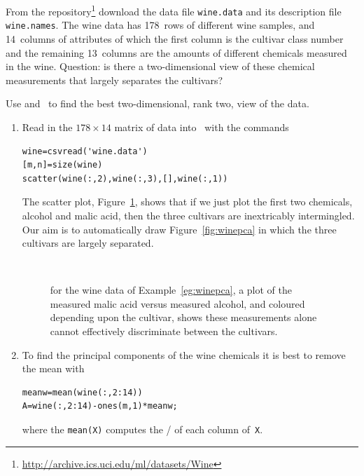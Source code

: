 \begin{example} \label{eg:winepca}
From the \cite{Lichman2013} repository\footnote{\url{http://archive.ics.uci.edu/ml/datasets/Wine}} download the data file \verb|wine.data| and its description file \verb|wine.names|.
The wine data has 178~rows of different wine samples, and 14~columns of attributes of which the first column is the cultivar class number and the remaining 13~columns are the amounts of different chemicals measured in the wine.
Question: is there a two-dimensional view of these chemical measurements that largely separates the cultivars?

\begin{solution} 
Use and \svd\ to find the best two-dimensional, rank two, view of the data.
\begin{enumerate}
\item Read in the \(178\times14\) matrix of data into \script\ with the commands
\begin{verbatim}
wine=csvread('wine.data')
[m,n]=size(wine)
scatter(wine(:,2),wine(:,3),[],wine(:,1))
\end{verbatim}
\setbox\ajrqrbox\hbox{}%
\marginpar{\usebox{\ajrqrbox\\[2ex]}}%
The scatter plot, Figure~\ref{fig:wine12}, shows that if we just plot the first two chemicals, alcohol and malic acid, then the three cultivars are inextricably intermingled.
Our aim is to automatically draw Figure~\ref{fig:winepca} in which the three cultivars are largely separated.
\begin{figure}
\centering
\\
\caption{for the wine data of Example~\ref{eg:winepca}, a plot of the measured malic acid versus measured alcohol, and coloured depending upon the cultivar, shows these measurements alone cannot effectively discriminate between the cultivars.}
\label{fig:wine12}
\end{figure}


\item To find the principal components of the wine chemicals it is best to remove the mean with
\begin{verbatim}
meanw=mean(wine(:,2:14))
A=wine(:,2:14)-ones(m,1)*meanw;
\end{verbatim}
where the \verb|mean(X)| computes the \slash {} of each column of~\verb|X|.


\end{enumerate}
\end{solution}
\end{example}
